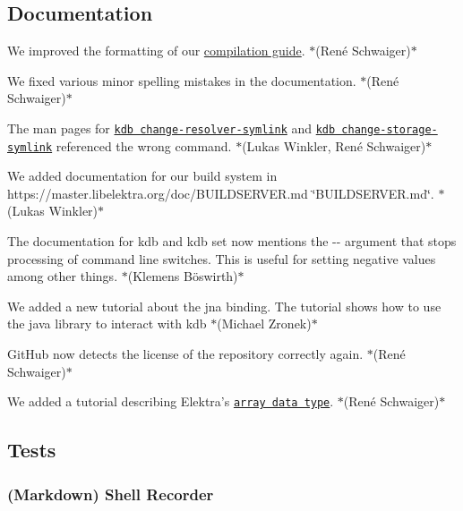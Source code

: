 \subsection*{Documentation}


\begin{DoxyItemize}
\item We improved the formatting of our \hyperlink{doc_COMPILE_md}{compilation guide}. $\ast$(René Schwaiger)$\ast$
\item We fixed various minor spelling mistakes in the documentation. $\ast$(René Schwaiger)$\ast$
\item The man pages for \href{https://www.libelektra.org/manpages/kdb-change-resolver-symlink}{\tt {\ttfamily kdb change-\/resolver-\/symlink}} and \href{https://www.libelektra.org/manpages/kdb-change-storage-symlink}{\tt {\ttfamily kdb change-\/storage-\/symlink}} referenced the wrong command. $\ast$(Lukas Winkler, René Schwaiger)$\ast$
\item We added documentation for our build system in https\+://master.libelektra.\+org/doc/\+B\+U\+I\+L\+D\+S\+E\+R\+V\+ER.md \char`\"{}\+B\+U\+I\+L\+D\+S\+E\+R\+V\+E\+R.\+md\char`\"{}. $\ast$(Lukas Winkler)$\ast$
\item The documentation for {\ttfamily kdb} and {\ttfamily kdb set} now mentions the {\ttfamily -\/-\/} argument that stops processing of command line switches. This is useful for setting negative values among other things. $\ast$(Klemens Böswirth)$\ast$
\item We added a new tutorial about the jna binding. The tutorial shows how to use the java library to interact with kdb $\ast$(Michael Zronek)$\ast$
\item Git\+Hub now detects the license of the repository correctly again. $\ast$(René Schwaiger)$\ast$
\item We added a tutorial describing Elektra’s \href{https://www.libelektra.org/tutorials/arrays}{\tt array data type}. $\ast$(René Schwaiger)$\ast$
\end{DoxyItemize}

\subsection*{Tests}

\subsubsection*{(Markdown) Shell Recorder}


